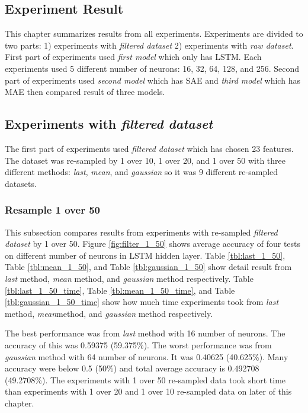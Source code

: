 \documentclass[draft,dvipsnames]{drexel-thesis}
\begin{document}
\begin{thesis}
\chapter{Experiment Result}\label{chap:result}
This chapter summarizes results from all experiments. Experiments are divided to two parts: 1) experiments with {\em filtered dataset} 2) experiments with {\em raw dataset}. First part of experiments used {\em first model} which only has LSTM. Each experiments used 5 different number of neurons: 16, 32, 64, 128, and 256. Second part of experiments used {\em second model} which has SAE and {\em third model} which has MAE then compared result of three models.

\section{Experiments with {\em filtered dataset}}
The first part of experiments used {\em filtered dataset} which has chosen 23 features. The dataset was re-sampled by 1 over 10, 1 over 20, and 1 over 50 with three different methods: {\em last}, {\em mean}, and {\em gaussian} so it was 9 different re-sampled datasets.

\subsection{Resample 1 over 50}
This subsection compares results from experiments with re-sampled {\em filtered dataset} by 1 over 50. Figure \ref{fig:filter_1_50} shows average accuracy of four tests on different number of neurons in LSTM hidden layer. Table \ref{tbl:last_1_50}, Table \ref{tbl:mean_1_50}, and Table \ref{tbl:gaussian_1_50} show detail result from {\em last} method, {\em mean} method, and {\em gaussian} method respectively. Table \ref{tbl:last_1_50_time}, Table \ref{tbl:mean_1_50_time}, and Table \ref{tbl:gaussian_1_50_time} show how much time experiments took from {\em last} method, {\em mean}method, and {\em gaussian} method respectively.

The best performance was from {\em last} method with 16 number of neurons. The accuracy of this was 0.59375 (59.375\%). The worst performance was from {\em gaussian} method with 64 number of neurons. It was 0.40625 (40.625\%). Many accuracy were below 0.5 (50\%) and total average accuracy is 0.492708 (49.2708\%). The experiments with 1 over 50 re-sampled data took short time than experiments with 1 over 20 and 1 over 10 re-sampled data on later of this chapter.


\end{thesis}
\end{document}
